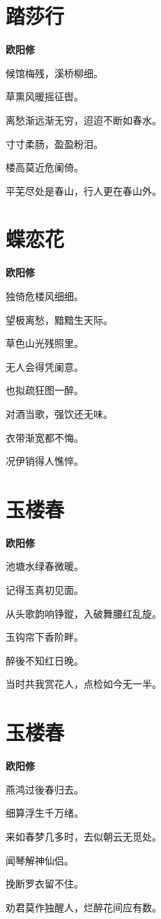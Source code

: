 \documentclass[12pt,a4paper]{ctexbook}
\begin{document}
\section{踏莎行}
\textbf{欧阳修}\par\vspace{0.5em}
候馆梅残，溪桥柳细。\par
草熏风暖摇征辔。\par
离愁渐远渐无穷，迢迢不断如春水。\par
寸寸柔肠，盈盈粉泪。\par
楼高莫近危阑倚。\par
平芜尽处是春山，行人更在春山外。\par

\section{蝶恋花}
\textbf{欧阳修}\par\vspace{0.5em}
独倚危楼风细细。\par
望极离愁，黯黯生天际。\par
草色山光残照里。\par
无人会得凭阑意。\par
也拟疏狂图一醉。\par
对酒当歌，强饮还无味。\par
衣带渐宽都不悔。\par
况伊销得人憔悴。\par

\section{玉楼春}
\textbf{欧阳修}\par\vspace{0.5em}
池塘水绿春微暖。\par
记得玉真初见面。\par
从头歌韵响铮鏦，入破舞腰红乱旋。\par
玉钩帘下香阶畔。\par
醉後不知红日晚。\par
当时共我赏花人，点检如今无一半。\par

\section{玉楼春}
\textbf{欧阳修}\par\vspace{0.5em}
燕鸿过後春归去。\par
细算浮生千万绪。\par
来如春梦几多时，去似朝云无觅处。\par
闻琴解神仙侣。\par
挽断罗衣留不住。\par
劝君莫作独醒人，烂醉花间应有数。\par
\end{document}
